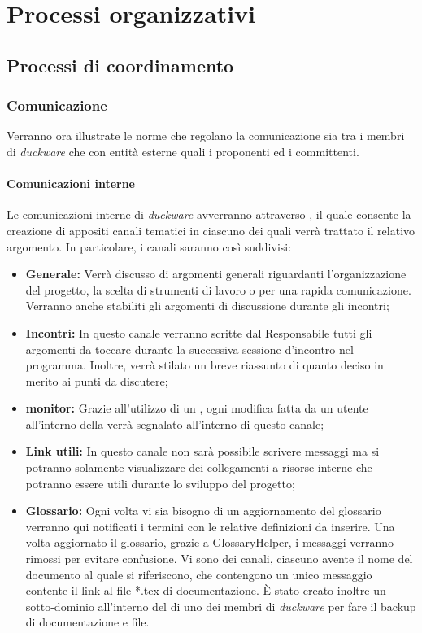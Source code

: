 \clearpage
\section{Processi organizzativi}
\subsection{Processi di coordinamento}
\subsubsection{Comunicazione}
Verranno ora illustrate le norme che regolano la comunicazione sia tra i membri di \emph{duckware} che con entità esterne quali i proponenti ed i committenti.

\paragraph{Comunicazioni interne}
Le comunicazioni interne di \emph{duckware} avverranno attraverso , il quale consente la creazione di appositi canali tematici in ciascuno dei quali verrà trattato il relativo argomento. In particolare, i canali saranno così suddivisi:
\begin{itemize}
    \item \textbf{Generale: }Verrà discusso di argomenti generali riguardanti l’organizzazione del progetto, la scelta di strumenti di lavoro o per una rapida comunicazione. Verranno anche stabiliti gli argomenti di discussione durante gli incontri;
    \item \textbf{Incontri: }In questo canale verranno scritte dal Responsabile tutti gli argomenti da toccare durante la successiva sessione d’incontro nel programma. Inoltre, verrà stilato un breve riassunto di quanto deciso in merito ai punti da discutere;
    \item \textbf{ monitor: }Grazie all’utilizzo di un , ogni modifica fatta da un utente all’interno della  verrà segnalato all’interno di questo canale;
    \item \textbf{Link utili: }In questo canale non sarà possibile scrivere messaggi ma si potranno solamente visualizzare dei collegamenti a risorse interne che potranno essere utili durante lo sviluppo del progetto;
    \item \textbf{Glossario: }Ogni volta vi sia bisogno di un aggiornamento del glossario verranno qui notificati i termini con le relative definizioni da inserire. Una volta aggiornato il glossario, grazie a GlossaryHelper, i messaggi verranno rimossi per evitare confusione.
Vi sono dei canali, ciascuno avente il nome del documento al quale si riferiscono, che contengono un unico messaggio contente il link al file *.tex di documentazione. È stato creato inoltre un sotto-dominio all’interno del  di uno dei membri di \emph{duckware} per fare il backup di documentazione e file.
\end{itemize}

